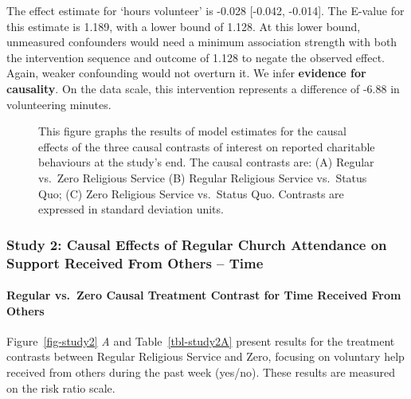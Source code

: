 \documentclass[
  single column]{article}
\let\oldparagraph\paragraph
\renewcommand{\paragraph}[1]{\oldparagraph{#1}\mbox{}}
\begin{document}
The effect estimate for `hours volunteer' is -0.028 {[}-0.042,
-0.014{]}. The E-value for this estimate is 1.189, with a lower bound of
1.128. At this lower bound, unmeasured confounders would need a minimum
association strength with both the intervention sequence and outcome of
1.128 to negate the observed effect. Again, weaker confounding would not
overturn it. We infer \textbf{evidence for causality}. On the data
scale, this intervention represents a difference of -6.88 in
volunteering minutes.

\begin{figure}


\caption{\label{fig-1_1}This figure graphs the results of model
estimates for the causal effects of the three causal contrasts of
interest on reported charitable behaviours at the study's end. The
causal contrasts are: (A) Regular vs.~Zero Religious Service (B) Regular
Religious Service vs.~Status Quo; (C) Zero Religious Service vs.~Status
Quo. Contrasts are expressed in standard deviation units.}

\end{figure}%

\newpage{}

\subsubsection{Study 2: Causal Effects of Regular Church Attendance on
Support Received From Others --
Time}\label{study-2-causal-effects-of-regular-church-attendance-on-support-received-from-others-time}

\paragraph{Regular vs.~Zero Causal Treatment Contrast for Time Received
From
Others}\label{regular-vs.-zero-causal-treatment-contrast-for-time-received-from-others}

Figure~\ref{fig-study2} \emph{A} and Table~\ref{tbl-study2A} present
results for the treatment contrasts between Regular Religious Service
and Zero, focusing on voluntary help received from others during the
past week (yes/no). These results are measured on the risk ratio scale.
\end{document}
